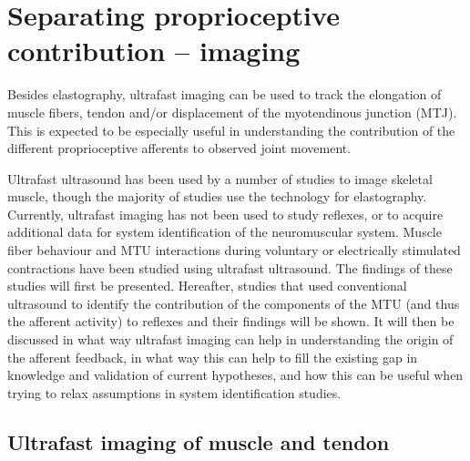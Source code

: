 \section{Separating proprioceptive contribution -- imaging}
Besides elastography, ultrafast imaging can be used to track the elongation of muscle fibers, tendon and/or displacement of the myotendinous junction (MTJ). This is expected to be especially useful in understanding the contribution of the different proprioceptive afferents to observed joint movement. 

Ultrafast ultrasound has been used by a number of studies to image skeletal muscle, though the majority of studies use the technology for elastography. Currently, ultrafast imaging has not been used to study reflexes, or to acquire additional data for system identification of the neuromuscular system. Muscle fiber behaviour and MTU interactions during voluntary or electrically stimulated contractions have been studied using ultrafast ultrasound. The findings of these studies will first be presented. 
Hereafter, studies that used conventional ultrasound to identify the contribution of the components of the MTU (and thus the afferent activity) to reflexes and their findings will be shown. It will then be discussed in what way ultrafast imaging can help in understanding the origin of the afferent feedback, in what way this can help to fill the existing gap in knowledge and validation of current hypotheses, and how this can be useful when trying to relax assumptions in system identification studies.



\subsection{Ultrafast imaging of muscle and tendon}
\label{sec:ufus_muscle_tendon}


